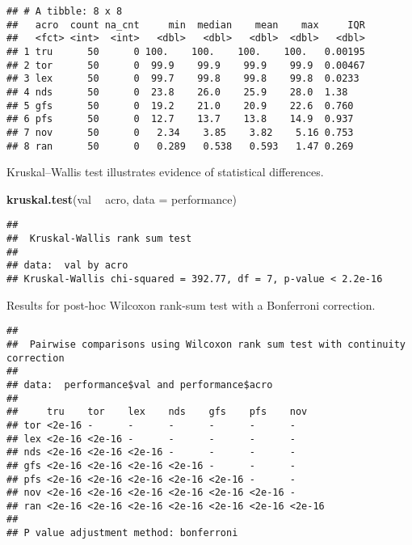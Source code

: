 \documentclass[]{book}
\newenvironment{Shaded}{\begin{snugshade}}{\end{snugshade}}
\newcommand{\DataTypeTok}[1]{\textcolor[rgb]{0.13,0.29,0.53}{#1}}
\newcommand{\KeywordTok}[1]{\textcolor[rgb]{0.13,0.29,0.53}{\textbf{#1}}}
\newcommand{\NormalTok}[1]{#1}
\newcommand{\OperatorTok}[1]{\textcolor[rgb]{0.81,0.36,0.00}{\textbf{#1}}}
\newcommand{\OtherTok}[1]{\textcolor[rgb]{0.56,0.35,0.01}{#1}}
\newcommand{\StringTok}[1]{\textcolor[rgb]{0.31,0.60,0.02}{#1}}
\begin{document}
\begin{verbatim}
## # A tibble: 8 x 8
##   acro  count na_cnt     min  median    mean    max     IQR
##   <fct> <int>  <int>   <dbl>   <dbl>   <dbl>  <dbl>   <dbl>
## 1 tru      50      0 100.    100.    100.    100.   0.00195
## 2 tor      50      0  99.9    99.9    99.9    99.9  0.00467
## 3 lex      50      0  99.7    99.8    99.8    99.8  0.0233 
## 4 nds      50      0  23.8    26.0    25.9    28.0  1.38   
## 5 gfs      50      0  19.2    21.0    20.9    22.6  0.760  
## 6 pfs      50      0  12.7    13.7    13.8    14.9  0.937  
## 7 nov      50      0   2.34    3.85    3.82    5.16 0.753  
## 8 ran      50      0   0.289   0.538   0.593   1.47 0.269
\end{verbatim}

Kruskal--Wallis test illustrates evidence of statistical differences.

\begin{Shaded}
\begin{Highlighting}[]
\KeywordTok{kruskal.test}\NormalTok{(val }\OperatorTok{~}\StringTok{ }\NormalTok{acro, }\DataTypeTok{data =}\NormalTok{ performance)}
\end{Highlighting}
\end{Shaded}

\begin{verbatim}
## 
##  Kruskal-Wallis rank sum test
## 
## data:  val by acro
## Kruskal-Wallis chi-squared = 392.77, df = 7, p-value < 2.2e-16
\end{verbatim}

Results for post-hoc Wilcoxon rank-sum test with a Bonferroni correction.

\begin{Shaded}
\end{Shaded}

\begin{verbatim}
## 
##  Pairwise comparisons using Wilcoxon rank sum test with continuity correction 
## 
## data:  performance$val and performance$acro 
## 
##     tru    tor    lex    nds    gfs    pfs    nov   
## tor <2e-16 -      -      -      -      -      -     
## lex <2e-16 <2e-16 -      -      -      -      -     
## nds <2e-16 <2e-16 <2e-16 -      -      -      -     
## gfs <2e-16 <2e-16 <2e-16 <2e-16 -      -      -     
## pfs <2e-16 <2e-16 <2e-16 <2e-16 <2e-16 -      -     
## nov <2e-16 <2e-16 <2e-16 <2e-16 <2e-16 <2e-16 -     
## ran <2e-16 <2e-16 <2e-16 <2e-16 <2e-16 <2e-16 <2e-16
## 
## P value adjustment method: bonferroni
\end{verbatim}
\end{document}
